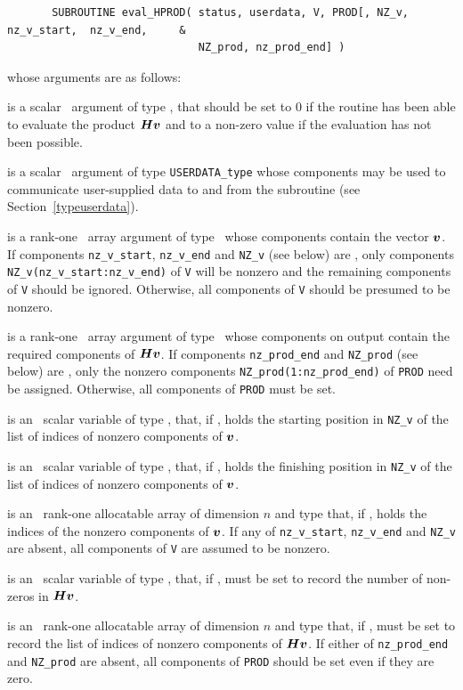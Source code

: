 \documentclass{galahad}
\begin{document}
\def\baselinestretch{0.8}
{\tt \begin{verbatim}
       SUBROUTINE eval_HPROD( status, userdata, V, PROD[, NZ_v, nz_v_start,  nz_v_end,     &
                              NZ_prod, nz_prod_end] )
\end{verbatim} }
\def\baselinestretch{1.0}
\noindent whose arguments are as follows:

\begin{description}
 is a scalar \intentout\ argument of type \integer,
that should be set to 0 if the routine has been able to evaluate the
product ${\bm{H}} {\bm{v}}$ 
and to a non-zero value if the evaluation has not been possible.

 is a scalar \intentinout\ argument of type 
{\tt USERDATA\_type} whose components may be used
to communicate user-supplied data to and from the
subroutine (see Section~\ref{typeuserdata}). 

 is a rank-one \intentin\ array argument of type \realdp\
whose components contain the vector ${\bm{v}}$. 
If components
{\tt nz\_v\_start},
{\tt nz\_v\_end} 
and
{\tt NZ\_v} 
(see below) are \present,
only components {\tt NZ\_v(nz\_v\_start:nz\_v\_end)} of {\tt V} 
will be nonzero and the remaining components of {\tt V} should be
ignored. Otherwise, all components of {\tt V} should be presumed to be nonzero.

 is a rank-one \intentout\ array argument of type \realdp\
whose components on output contain the required components of ${\bm{H}} {\bm{v}}$.
If components
{\tt nz\_prod\_end} 
and
{\tt NZ\_prod} 
(see below) are \present, 
only the nonzero components {\tt NZ\_prod(1:nz\_prod\_end)} of {\tt PROD} 
need be assigned.
Otherwise, all components of {\tt PROD} must be set.

 is an \optional\ scalar variable of type \integer, 
that, if \present, holds the starting position in {\tt NZ\_v}
of the list of indices of nonzero components of ${\bm{v}}$.

 is an \optional\ scalar variable of type \integer, 
that, if \present, holds the finishing position in {\tt NZ\_v}
of the list of indices of nonzero components of ${\bm{v}}$.

 is an \optional\  rank-one allocatable array of dimension $n$
and type \integer that, if \present, holds the indices of the
nonzero components of ${\bm{v}}$. If any of 
{\tt nz\_v\_start},
{\tt nz\_v\_end} 
and
{\tt NZ\_v} 
are absent, all components of {\tt V} are assumed to be nonzero.

\itt{nz\_prod\_end} is an \optional\ scalar variable of type \integer,
that, if \present, must be set to record the number of non-zeros in 
${\bm{H}} {\bm{v}}$.

 is an \optional\ rank-one allocatable array of dimension $n$
and type \integer that, if \present, must be set to record the list of
indices of nonzero components of ${\bm{H}} {\bm{v}}$. 
If either of 
{\tt nz\_prod\_end} 
and
{\tt NZ\_prod} 
are absent, all components of {\tt PROD} should be set even if they are zero.


\end{description}
\end{document}
